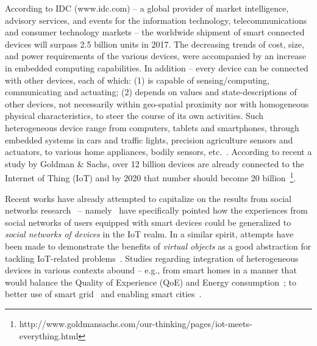 
According to IDC (www.idc.com) -- a global provider of market intelligence, advisory services, and events for the information technology, telecommunications and consumer technology markets -- the worldwide shipment of smart connected devices will surpass 2.5 billion units in 2017. The decreasing trends of cost, size, and power requirements of the various devices, were accompanied by an increase in embedded computing capabilities. In addition -- every device can be connected with other devices, each of which: (1) is capable of sensing/computing, communicating and actuating; (2) depends on values and state-descriptions of other devices, not necessarily within geo-spatial proximity nor with homogeneous physical characteristics, to steer the course of its own activities.  Such heterogeneous device range from computers, tablets and smartphones, through embedded systems in cars and traffic lights, precision agriculture sensors and actuators, to various home appliances, bodily sensors, etc.~\cite{Al-FuqahaGMAA15,AtzoriIM10,MelodiaPGA07,SalarianCN12}. According to recent a study by Goldman \& Sachs, over 12 billion devices are already connected to the Internet of Thing (IoT) and by 2020 that number should become 20 billion~\footnote{http://www.goldmansachs.com/our-thinking/pages/iot-meets-everything.html}.


Recent works have already attempted to capitalize on the results from social networks research~\cite{AhmedEH15,Hai-Jew16,MorrisTP10,VenturiniJL15} -- namely~\cite{AtzoriCI14,IeraMA15} have specifically pointed how the experiences from social networks of users equipped with smart devices could be generalized to {\it social networks of devices} in the IoT realm. In a similar spirit, attempts have been made to demonstrate the benefits of {\it virtual objects} as a good abstraction for tackling IoT-related problems~\cite{NittiPCA16}. Studies regarding integration of heterogeneous devices in various contexts abound -- e.g., from smart homes in a manner that would balance the Quality of Experience (QoE) and Energy consumption~\cite{FlorisMPA15}; to better use of smart grid~\cite{LuoAM14} and enabling smart cities~\cite{ZanellaBCVZ14}.

